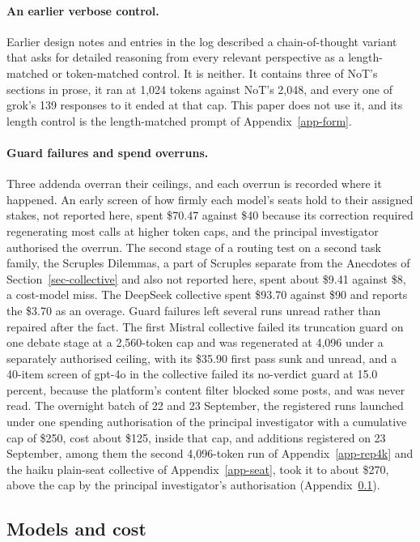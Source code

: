 \paragraph{An earlier verbose control.}
Earlier design notes and entries in the log described a chain-of-thought
variant that asks for detailed
reasoning from every relevant perspective as a length-matched or token-matched
control. It is neither. It contains three of NoT's sections in prose, it ran
at 1,024 tokens against NoT's 2,048, and every one of grok's 139 responses to
it ended at that cap. This paper does not use it, and its length control is
the length-matched prompt of Appendix~\ref{app-form}.

\paragraph{Guard failures and spend overruns.}
Three addenda overran their ceilings, and each overrun is recorded where it
happened. An early screen of how firmly each model's seats hold to their assigned
stakes, not reported here, spent \$70.47 against \$40 because
its correction required regenerating most calls at higher token caps, and the
principal investigator authorised the overrun. The second stage of a routing
test on a second task family, the Scruples Dilemmas, a part of Scruples
separate from the Anecdotes of Section~\ref{sec-collective} and also not
reported here, spent about \$9.41 against \$8, a cost-model miss. The DeepSeek collective
spent \$93.70 against
\$90 and reports the \$3.70 as an overage.
Guard failures left several runs unread rather than repaired after the fact.
The first Mistral collective failed its truncation guard on one debate stage at a
2,560-token cap and was regenerated at 4,096 under a separately authorised
ceiling, with its \$35.90 first pass sunk and unread, and a 40-item screen of
gpt-4o in the collective failed its no-verdict guard at 15.0 percent, because the
platform's content filter blocked some posts, and was never read.
The overnight batch of 22 and 23 September, the registered runs launched
under one spending authorisation of the principal investigator with a
cumulative cap of \$250, cost about \$125, inside that cap, and additions registered on 23 September, among them the second
4,096-token run of Appendix~\ref{app-rep4k} and the haiku plain-seat
collective of Appendix~\ref{app-seat}, took it to about \$270, above the cap
by the principal investigator's authorisation (Appendix~\ref{app-cost}).

\subsection{Models and cost}
\label{app-cost}

